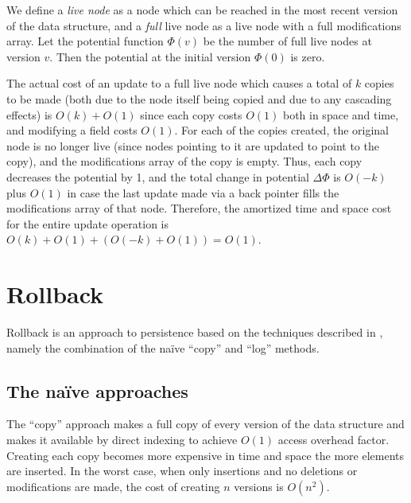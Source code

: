 We define a \emph{live node} as a node which can be reached in the most recent
version of the data structure, and a \emph{full} live node as a live node with a
full modifications array. Let the potential function $\Phi(v)$ be the number of
full live nodes at version $v$. Then the potential at the initial version
$\Phi(0)$ is zero.

The actual cost of an update to a full live node which causes a total of $k$
copies to be made (both due to the node itself being copied and due to any
cascading effects) is $O(k) + O(1)$ since each copy costs $O(1)$ both in space
and time, and modifying a field costs $O(1)$. For each of the copies created,
the original node is no longer live (since nodes pointing to it are updated to
point to the copy), and the modifications array of the copy is empty. Thus, each
copy decreases the potential by 1, and the total change in potential
$\Delta\Phi$ is $O(-k)$ plus $O(1)$ in case the last update made via a back
pointer fills the modifications array of that node. Therefore, the amortized
time and space cost for the entire update operation is $O(k) + O(1) + (O(-k) +
O(1)) = O(1)$.

% 
% 

\section{Rollback}
Rollback is an approach to persistence based on the techniques described in
\cite{Tsotras1995237}, namely the combination of the na\"ive ``copy'' and
``log'' methods.

\subsection{The na\"ive approaches}
The ``copy'' approach makes a full copy of every version of the data structure
and makes it available by direct indexing to achieve $O(1)$ access overhead
factor. Creating each copy becomes more expensive in time and space the more
elements are inserted. In the worst case, when only insertions and no deletions
or modifications are made, the cost of creating $n$ versions is
$O\left(n^2\right)$.

